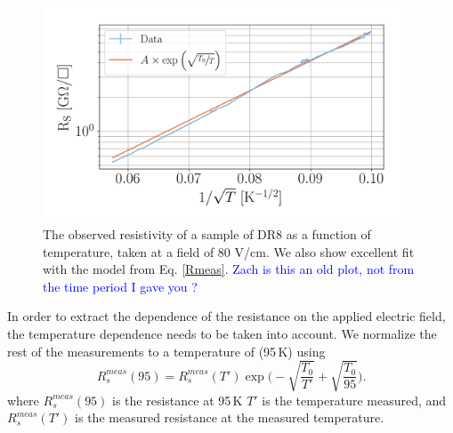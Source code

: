 \documentclass[a4paper,12pt]{article}
\newcommand{\RI}[1]{\textcolor{blue}{#1}}
\begin{document}
\begin{figure}
\centering
\includegraphics[width=0.95\textwidth]{temp_sheetRes_dr8_cooldown.png}
\caption{The observed resistivity of a sample of DR8 as a function of temperature, taken at a field of 80 V/cm. We also show excellent fit with the model from Eq. \ref{Rmeas}. \RI{Zach is this an old plot, not from the time period I gave you ?}}
\label{fig:cooldown}
\end{figure}
In order to extract the dependence of the resistance on the applied electric field, the temperature dependence needs to be taken into account. We normalize the rest of the measurements to a temperature of (95\,K) using 
\begin{equation}
R_{s}^{meas}(95)=R_{s}^{meas}(T')\exp\bigg(-\sqrt{\frac{T_0}{T'}}+\sqrt{\frac{T_0}{95}}\bigg).
\end{equation}
where $R_s^{meas}(95)$ is the resistance at 95\,K $T'$ is the temperature measured, and $R_{s}^{meas}(T')$ is the measured resistance at the measured temperature. 
\end{document}
